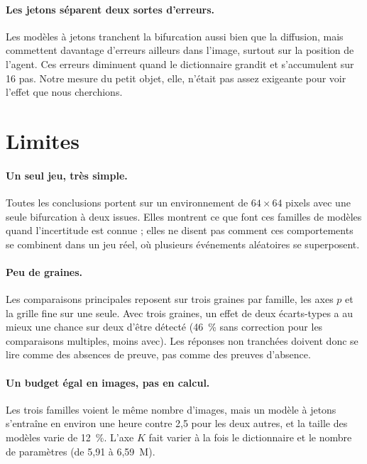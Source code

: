 \documentclass[a4paper, 11pt]{article}
\begin{document}
\paragraph{Les jetons séparent deux sortes d'erreurs.} Les modèles à jetons tranchent la bifurcation aussi bien que la
diffusion, mais commettent davantage d'erreurs ailleurs dans l'image, surtout sur la position de l'agent. Ces erreurs
diminuent quand le dictionnaire grandit et s'accumulent sur 16 pas. Notre mesure du petit objet, elle, n'était pas assez
exigeante pour voir l'effet que nous cherchions.

\section{Limites}\label{sec:limites}

\paragraph{Un seul jeu, très simple.} Toutes les conclusions portent sur un environnement de $64\times64$ pixels avec une seule
bifurcation à deux issues. Elles montrent ce que font ces familles de modèles quand l'incertitude est connue ; elles ne disent
pas comment ces comportements se combinent dans un jeu réel, où plusieurs événements aléatoires se superposent.

\paragraph{Peu de graines.} Les comparaisons principales reposent sur trois graines par famille, les axes $p$ et la grille fine
sur une seule. Avec trois graines, un effet de deux écarts-types a au mieux une chance sur deux d'être détecté (46~\% sans
correction pour les comparaisons multiples, moins avec). Les réponses non tranchées doivent donc se lire comme des absences
de preuve, pas comme des preuves d'absence.

\paragraph{Un budget égal en images, pas en calcul.} Les trois familles voient le même nombre d'images, mais un modèle à jetons
s'entraîne en environ une heure contre 2,5 pour les deux autres, et la taille des modèles varie de 12~\%. L'axe $K$ fait varier
à la fois le dictionnaire et le nombre de paramètres (de 5,91 à 6,59~M).
\end{document}

